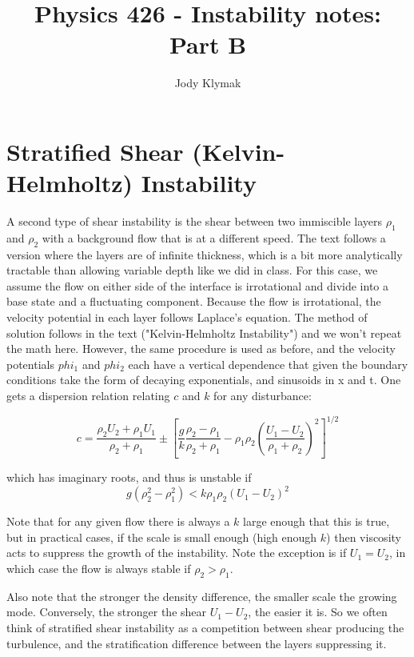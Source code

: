 \documentclass[11pt]{article}
\title{Physics 426 - Instability notes: Part B}
\author{Jody Klymak}
\begin{document}
\maketitle
\pagestyle{fancy}

\section{Stratified Shear (Kelvin-Helmholtz) Instability}

A second type of shear instability is the shear between two immiscible layers $\rho_1$ and $\rho_2$ with a background flow that is at a different speed.  The text follows a version where the layers are of infinite thickness, which is a bit more analytically tractable than allowing variable depth like we did in class.  For this case, we assume the flow on either side of the interface is irrotational and divide into a base state and a fluctuating component.  Because the flow is irrotational, the velocity potential in each layer follows Laplace's equation.  The method of solution follows in the text ("Kelvin-Helmholtz Instability") and we won't repeat the math here.  However, the same procedure is used as before, and the velocity potentials $phi_1$ and $phi_2$ each have a vertical dependence that given the boundary conditions take the form of decaying exponentials, and sinusoids in x and t.  One gets a dispersion relation relating $c$ and $k$ for any disturbance:

\begin{equation}
  c  = \frac{\rho_2 U_2 + \rho_1 U_1}{\rho_2 + \rho_1} \pm \left[\frac{g}{k}\frac{\rho_2 - \rho_1}{\rho_2+\rho_1} - \rho_1\rho_2\left(\frac{U_1 - U_2}{\rho_1 + \rho_2} \right)^2 \right]^{1/2}
\end{equation}

which has imaginary roots, and thus is unstable if 
\begin{equation}
  g\left(\rho_2^2 - \rho_1^2 \right) < k\rho_1\rho_2\left(U_1-U_2\right)^2
\end{equation}

Note that for any given flow there is always a $k$ large enough that this is true, but in practical cases, if the scale is small enough (high enough $k$) then viscosity acts to suppress the growth of the instability.  Note the exception is if $U_1=U_2$, in which case the flow is always stable if $\rho_2 > \rho_1$.  

Also note that the stronger the density difference, the smaller scale the growing mode.  Conversely, the stronger the shear $U_1-U_2$, the easier it is.  So we often think of stratified shear instability as a competition between shear producing the turbulence, and the stratification difference between the layers suppressing it.  
\end{document}
